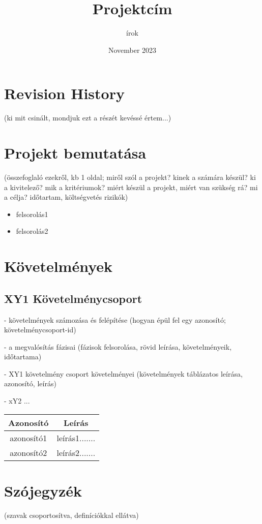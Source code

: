 \documentclass{article}
\title{Projektcím}
\author{írok}
\date{November 2023}
\begin{document}
\maketitle

\section{Revision History}
(ki mit csinált, mondjuk ezt a részét kevéssé értem...)

\maketitle

\section{Projekt bemutatása}
(összefoglaló ezekről, kb 1 oldal;
miről szól a projekt?
kinek a számára készül?
ki a kivitelező?
mik a kritériumok?
miért készül a projekt, miért van szükség rá?
mi a célja?
időtartam, költségvetés
rizikók)


\begin{itemize}
\item felsorolás1
\item felsorolás2
\end{itemize}

\maketitle

\section{Követelmények}

\subsection{XY1 Követelménycsoport}


- követelmények számozása és felépítése
(hogyan épül fel egy azonosító; követelménycsoport-id)

- a megvalósítás fázisai
(fázisok felsorolása, rövid leírása, követelményeik, időtartama)

- XY1 követelmény csoport követelményei
(követelmények táblázatos leírása, azonosító, leírás)

- xY2 ...


\begin{tabular}{ |c|c| }
    \hline
    Azonosító & Leírás \\
    \hline\hline
    azonosító1 & leírás1....... \\
    \hline
    azonosító2 & leírás2....... \\
    \hline
\end{tabular}



\maketitle

\section{Szójegyzék}

(szavak csoportosítva, definíciókkal ellátva)
\end{document}
